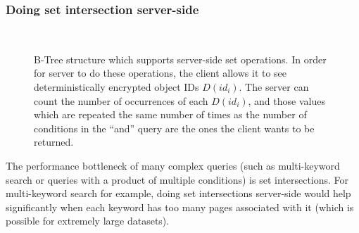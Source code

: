 \documentclass[notitlepage,longbibliography]{revtex4-1}
\begin{document}
\subsubsection{Doing set intersection server-side}
\label{sec:server-intersection}

\begin{figure}
	\begin{center}
        \qquad
        \\
	\end{center}
    \caption{B-Tree structure which supports server-side set operations.
        In order for server to do these operations, the client allows it to see deterministically encrypted object IDs $D(id_i)$.
        The server can count the number of occurrences of each $D(id_i)$, and those values which are repeated the same number of times as the number of conditions in the ``and'' query are the ones the client wants to be returned.
    }
	\label{fig:server-side-sets}
\end{figure}

The performance bottleneck of many complex queries (such as multi-keyword search or queries with a product of multiple conditions) is set intersections.
For multi-keyword search for example, doing set intersections server-side would help significantly when each keyword has too many pages associated with it (which is possible for extremely large datasets).
\end{document}
